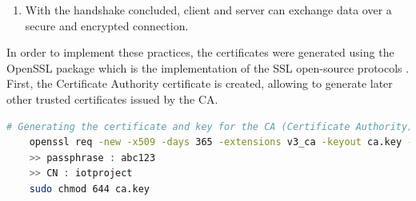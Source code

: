 \documentclass[target=bach,aauheader=,style=]{thud}
\begin{document}
\begin{enumerate}
\begin{itemize}
	\item The client sends its certificate to the server.
	\item The client creates a \textbf{Pre-Master Secret} with the two randomly generated values exchanged during the \lstinline[style=]|Client/Server Hello| messages using an algorithm which they agreed upon before (usually RSA). 
	Then it encrypts the value using the server's Public Key, and sends it to the server: now both have the same Pre-Master Secret, since the Server can decrypt the message using its Private Key.\\
	Now both ends can derive the \textbf{Master Secret}, which is used to generate the \textbf{Session Keys} that will allow to have an encrypted conversation. It's important that both sides obtain the same result, as otherwise it is not possible to communicate.
	\item If requested before, the client sends hashed information that the server can use to validate its certificate.
	\item Before sending a "\lstinline[style=bash]|Client Finish|" message, it also sends a "\lstinline[style=bash]|Change Cipher Spec|" that tells the server to start encrypting the conversation.
	\item Lastly, the server also responds with a "\lstinline[style=bash]|Change Cipher Spec|" before concluding the handshake process with a "\lstinline[style=bash]|Client Finish|" message.
\end{itemize}

\item With the handshake concluded, client and server can exchange data over a secure and encrypted connection.

\end{enumerate}
\newpage
In order to implement these practices, the certificates were generated using the OpenSSL package which is the implementation of the SSL open-source protocols \cite{tlsmqtt} \cite{tlsmosquitto}. First, the Certificate Authority certificate is created, allowing to generate later other trusted certificates issued by the CA.

\begin{lstlisting}[language=bash,style=bash]
	# Generating the certificate and key for the CA (Certificate Authority)
	openssl req -new -x509 -days 365 -extensions v3_ca -keyout ca.key -out ca.crt
	>> passphrase : abc123
	>> CN : iotproject
	sudo chmod 644 ca.key
\end{lstlisting}
\end{document}

